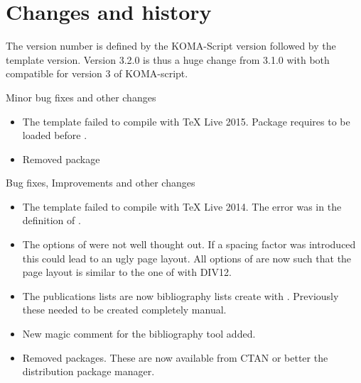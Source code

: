 
\chapter{Changes and history}
\label{appendix:doc:changes}

The version number is defined by the KOMA-Script version followed by the template version. 
Version 3.2.0 is thus a huge change from 3.1.0 with both compatible for version 3 of KOMA-script.


Minor bug fixes and other changes
\begin{itemize}
\item The template failed to compile with TeX Live 2015. Package  requires  to be loaded before . 
\item Removed package 
\end{itemize}


Bug fixes, Improvements and other changes
\begin{itemize}
\item The template failed to compile with TeX Live 2014. The error was in the definition of . 
\item The options of  were not well thought out. If a spacing factor was introduced this could lead to an ugly page layout. All options of  are now such that the page layout is similar to the one of  with DIV12. 
\item The publications lists are now bibliography lists create with . Previously these needed to be created completely manual.
\item New magic comment for the bibliography tool added.
\item Removed packages. These are now available from CTAN or better the distribution package manager. 
\end{itemize}


